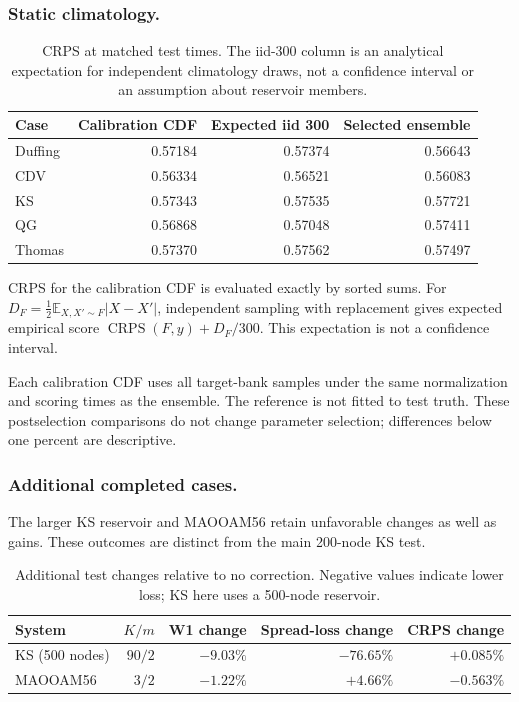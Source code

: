 \documentclass[gmd,manuscript]{copernicus}
\begin{document}
\subsubsection{Static climatology.}
\begin{table}[htbp]\caption{CRPS at matched test times. The iid-300 column is an analytical expectation for independent climatology draws, not a confidence interval or an assumption about reservoir members.}\label{tab:climatology-reference}
\centering\small\begin{tabular}{lrrr}\toprule
Case & Calibration CDF & Expected iid 300 & Selected ensemble\\\midrule
Duffing & 0.57184 & 0.57374 & 0.56643 \\
CDV & 0.56334 & 0.56521 & 0.56083 \\
KS & 0.57343 & 0.57535 & 0.57721 \\
QG & 0.56868 & 0.57048 & 0.57411 \\
Thomas & 0.57370 & 0.57562 & 0.57497 \\
\bottomrule\end{tabular}\end{table}
CRPS for the calibration CDF is evaluated exactly by sorted sums. For $D_F=\frac12\mathbb E_{X,X'\sim F}|X-X'|$, independent sampling with replacement gives expected empirical score $\operatorname{CRPS}(F,y)+D_F/300$. This expectation is not a confidence interval.

Each calibration CDF uses all target-bank samples under the same normalization and scoring times as the ensemble. The reference is not fitted to test truth. These postselection comparisons do not change parameter selection; differences below one percent are descriptive.

\subsubsection{Additional completed cases.}
The larger KS reservoir and MAOOAM56 retain unfavorable changes as well as gains. These outcomes are distinct from the main 200-node KS test.
\begin{table}[htbp]\caption{Additional test changes relative to no correction. Negative values indicate lower loss; KS here uses a 500-node reservoir.}\label{tab:completed-v4-original-set}
\centering\small\begin{tabular}{lrrrr}\toprule
System & $K/m$ & W1 change & Spread-loss change & CRPS change\\\midrule
KS (500 nodes) & $90/2$ & $-9.03\%$ & $-76.65\%$ & $+0.085\%$\\
MAOOAM56 & $3/2$ & $-1.22\%$ & $+4.66\%$ & $-0.563\%$\\
\bottomrule\end{tabular}\end{table}
\end{document}
